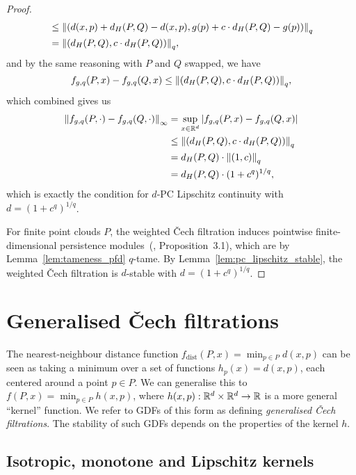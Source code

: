 \begin{proof}
\begin{align}
        & \leq \norm{(d(x, p) + d_H(P, Q) - d(x, p), g(p) + c \cdot d_H(P, Q) - g(p))}_q \\
        & = \norm{(d_H(P, Q), c \cdot d_H(P, Q))}_q,
    \end{align}
    and by the same reasoning with $P$ and $Q$ swapped, we have
    \begin{equation}
        f_{g, q}(P, x) - f_{g, q}(Q, x) \leq \norm{(d_H(P, Q), c \cdot d_H(P, Q))}_q,
    \end{equation}
    which combined gives us
    \begin{align}
        \norm{f_{g, q}(P, \cdot) - f_{g, q}(Q, \cdot)}_\infty
        & = \sup_{x \in \mathbb{R}^d} |f_{g, q}(P, x) - f_{g, q}(Q, x)| \\
        & \leq \norm{(d_H(P, Q), c \cdot d_H(P, Q))}_q \\
        & = d_H(P, Q) \cdot \norm{(1, c)}_q \\
        & = d_H(P, Q) \cdot (1 + c^q)^{1/q},
    \end{align}
    which is exactly the condition for $d$-PC Lipschitz continuity with $d = (1 + c^q)^{1/q}$.

    For finite point clouds $P$, the weighted \v{C}ech filtration induces 
    pointwise finite-dimensional persistence modules~(\cite{anai2020dtm},
    Proposition~3.1), which are by Lemma~\ref{lem:tameness_pfd} $q$-tame.
    By Lemma~\ref{lem:pc_lipschitz_stable}, the
    weighted \v{C}ech filtration is $d$-stable with $d = (1 + c^q)^{1/q}$.
\end{proof}

\section{Generalised \v{C}ech filtrations}

The nearest-neighbour distance function
$f_{\mathrm{dist}}(P, x) = \min_{p \in P} d(x, p)$ can be
seen as taking a minimum over a set of functions $h_p(x) = d(x, p)$, each
centered around a point $p \in P$. We can generalise this to
$f(P, x) = \min_{p \in P} h(x, p)$, where $h(x, p) : \mathbb{R}^d \times \mathbb{R}^d \to \mathbb{R}$ is
a more general ``kernel'' function. We refer to GDFs of this form as defining
\emph{generalised \v{C}ech filtrations}. The stability of such GDFs depends on
the properties of the kernel $h$.

\subsection{Isotropic, monotone and Lipschitz kernels}

